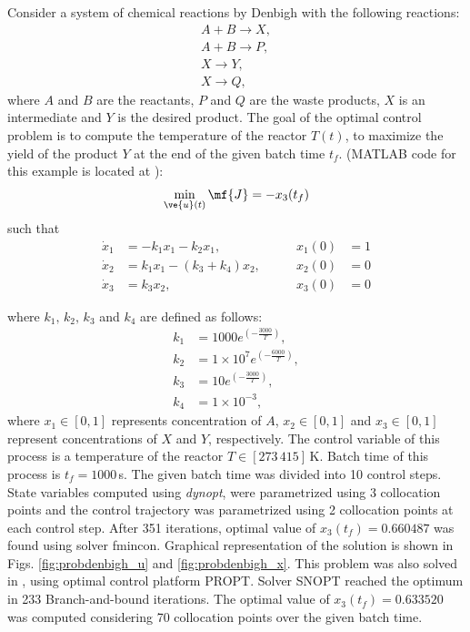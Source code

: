 Consider a system of chemical reactions by Denbigh \cite{den58} with the 
following reactions:
\begin{gather}
A + B \rightarrow X, \\
A + B \rightarrow P, \\
X \rightarrow Y, \\
X \rightarrow Q, 
\end{gather}
where $A$ and $B$ are the reactants, $P$ and $Q$ are the waste products, $X$ is an intermediate and $Y$ is the desired product. The goal of the optimal control problem is to compute the temperature of the reactor $T(t)$, to maximize the yield of the product $Y$ at the end of the given batch time $t_f$. (MATLAB code for this example is located
at ):
\begin{equation}
\min_{\ve{u}(t)} \mf{J} = -x_{3}(t_{f}) \label{eq:denbigh_dae}
\end{equation}
such that
\begin{align}
\dot{x}_1 & =  -k_{1}x_{1} -k_{2}x_{1} , &\qquad x_1(0) &= 1 \\
\dot{x}_{2}& = k_{1}x_{1} - (k_{3} + k_{4})x_{2} , & \qquad x_2(0) & = 0 \\
\dot{x}_3 & =  k_{3}x_{2} , & \qquad x_3(0) & = 0 
\end{align}

where $k_{1}, \, k_{2}, \, k_{3}$ and $k_{4}$ are defined as follows:
\begin{align}
k_{1} &= 1000 e^{(-\frac{3000}{T})}, \\
k_{2} &= 1 \times 10^{7} e^{(-\frac{6000}{T})}, \\
k_{3} &= 10e^{(-\frac{3000}{T})}, \\
k_{4} &= 1 \times 10^{-3}, 
\end{align} where $x_{1} \in [0, 1] $  represents concentration
of $A$, $x_{2} \in [0, 1] $ and $x_{3} \in [0, 1]$  represent concentrations
of $X$ and $Y$, respectively. The control variable of this process is a temperature of the reactor $T \in [273 \,  415]$\,K.
Batch time of this process is $t_{f} = 1000$\,s. The given batch time was divided into 10 control steps. State variables computed using \emph{dynopt}, were parametrized using 3 collocation points and the control trajectory was parametrized using 2 collocation points at each control step.  After 351 iterations, optimal value of $x_{3}(t_{f}) = 0.660487$ was
found using solver fmincon. Graphical representation of the solution is shown in Figs. \ref{fig:probdenbigh_u}
and \ref{fig:probdenbigh_x}. This problem was also solved in \cite{rut10}, using optimal control platform PROPT. Solver SNOPT reached the optimum in 233 Branch-and-bound iterations. The optimal value of  $x_{3}(t_{f}) = 0.633520$ was computed considering 70 collocation points over the given batch time. 

